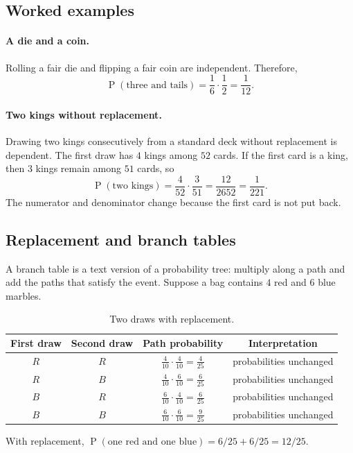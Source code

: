 \documentclass[11pt]{article}
\newcommand{\Pp}{\operatorname{P}}
\begin{document}
\subsection{Worked examples}
\paragraph{A die and a coin.} Rolling a fair die and flipping a fair coin are
independent.  Therefore,
\[
\Pp(\text{three and tails})=\frac{1}{6}\cdot\frac{1}{2}=\frac{1}{12}.
\]

\paragraph{Two kings without replacement.} Drawing two kings consecutively from
a standard deck without replacement is dependent.  The first draw has $4$ kings
among $52$ cards.  If the first card is a king, then $3$ kings remain among
$51$ cards, so
\[
\Pp(\text{two kings})=\frac{4}{52}\cdot\frac{3}{51}
=\frac{12}{2652}=\frac{1}{221}.
\]
The numerator and denominator change because the first card is not put back.

\subsection{Replacement and branch tables}
A branch table is a text version of a probability tree: multiply along a path
and add the paths that satisfy the event.  Suppose a bag contains $4$ red and
$6$ blue marbles.

\begin{table}[ht]
\centering
\caption{Two draws with replacement.}\label{tab:with-replacement}
\begin{tabular}{@{}cccc@{}}
\toprule
First draw & Second draw & Path probability & Interpretation \\
\midrule
$R$ & $R$ & $\frac{4}{10}\cdot\frac{4}{10}=\frac{4}{25}$ & probabilities unchanged \\
$R$ & $B$ & $\frac{4}{10}\cdot\frac{6}{10}=\frac{6}{25}$ & probabilities unchanged \\
$B$ & $R$ & $\frac{6}{10}\cdot\frac{4}{10}=\frac{6}{25}$ & probabilities unchanged \\
$B$ & $B$ & $\frac{6}{10}\cdot\frac{6}{10}=\frac{9}{25}$ & probabilities unchanged \\
\bottomrule
\end{tabular}
\end{table}

With replacement, $\Pp(\text{one red and one blue})=6/25+6/25=12/25$.
\end{document}
